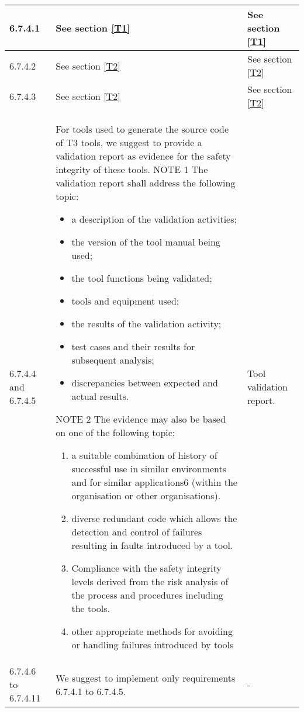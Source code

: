 \documentclass{template/openetcs_report}
\begin{document}
{\begin{longtable}{|p{2cm}|p{9cm}|p{3cm}|}
6.7.4.1 & See section \ref{T1} & See section \ref{T1}\\ 
\hline
6.7.4.2 & See section \ref{T2} & See section \ref{T2}\\ 
\hline
6.7.4.3 & See section \ref{T2} & See section \ref{T2}\\  
\hline
6.7.4.4 and 6.7.4.5 & For tools used to generate the source code of T3 tools, we suggest to provide a validation report as evidence for the safety integrity of these tools.
\linebreak
\linebreak
NOTE 1\linebreak
The validation report shall address the following topic:
\begin{itemize}\itemsep=0pt
  \item a description of the validation activities;
  \item the version of the tool manual being used;
  \item the tool functions being validated;
  \item tools and equipment used;
  \item the results of the validation activity;
  \item test cases and their results for subsequent analysis;
  \item discrepancies between expected and actual results.
\end{itemize}
NOTE 2\linebreak
The evidence may also be based on one of the following topic:
\begin{enumerate}\itemsep=0pt
  \item a suitable combination of history of successful use in similar environments and for similar applications6 (within the organisation or other organisations).
  \item diverse redundant code which allows the detection and control of failures resulting in faults introduced by a tool.
  \item Compliance with the safety integrity levels derived from the risk analysis of the process and procedures including the tools.
  \item other appropriate methods for avoiding or handling failures introduced by tools
\end{enumerate}
& Tool validation report.\\  
\hline
6.7.4.6 to 6.7.4.11 & We suggest to implement only requirements 6.7.4.1 to 6.7.4.5.
& - \\  
\hline
\end{longtable}}
\end{document}
